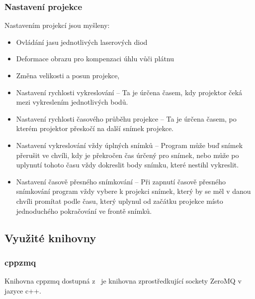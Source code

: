 \subsubsection{Nastavení projekce}
Nastavením projekcí jsou myšleny:
\begin{itemize}
\item Ovládání jasu jednotlivých laserových diod
\item Deformace obrazu pro kompenzaci úhlu vůči plátnu
\item Změna velikosti a posun projekce,
\item Nastavení rychlosti vykreslování -- Ta je úrčena časem, kdy projektor čeká mezi vykreslením jednotlivých bodů.
\item Nastavení rychlosti časového průběhu projekce -- Ta je úrčena časem, po kterém projektor přeskočí na další snímek projekce.
\item Nastavení vykreslování vždy úplných snímků -- Program může buď snímek přerušit ve chvíli, kdy je překročen čas úrčený pro snímek, nebo může po uplynutí tohoto času vždy dokreslit body snímku, které nestihl vykreslit.
\item Nastavení časově přesného snímkování -- Při zapnutí časově přesného snímkování program vždy vybere k projekci snímek, který by se měl v danou chvíli promítat podle času, který uplynul od začátku projekce místo jednoduchého pokračování ve frontě snímků.
\end{itemize}



\subsection{Využité knihovny}
\subsubsection{cppzmq}\label{sec:ls_cppzmq}
Knihovna cppzmq dostupná z~\cite{cppzmq} je knihovna zprostředkující sockety ZeroMQ v jazyce c++.

